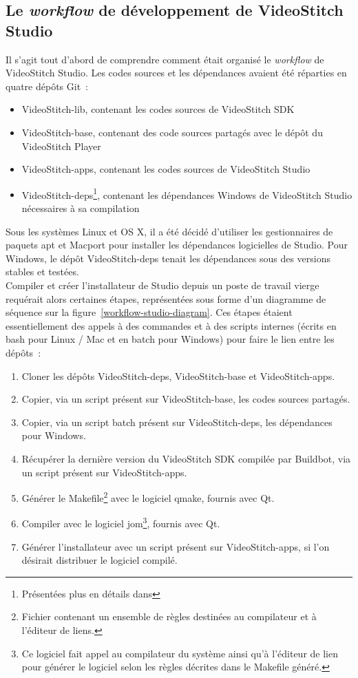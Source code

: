 \subsection{Le \textit{workflow} de développement de VideoStitch Studio}
\label{workflow-studio}
Il s'agit tout d'abord de comprendre comment était organisé le \textit{workflow} 
de VideoStitch Studio.
Les codes sources et les dépendances avaient été réparties en quatre dépôts Git~: 
\begin{itemize}
  \item VideoStitch-lib, contenant les codes sources de VideoStitch SDK
  \item VideoStitch-base, contenant des code sources partagés avec le dépôt du VideoStitch Player
  \item VideoStitch-apps, contenant les codes sources de VideoStitch Studio
  \item VideoStitch-deps\footnote{Présentées plus en détails dans }, 
  contenant les dépendances Windows de VideoStitch Studio 
  nécessaires à sa compilation
\end{itemize}
Sous les systèmes Linux et OS X, il a été décidé d'utiliser les gestionnaires
de paquets apt et Macport pour installer les dépendances logicielles de Studio. Pour
Windows, le dépôt VideoStitch-deps tenait les dépendances sous des versions stables et testées.\\
\newline
Compiler et créer l'installateur de Studio depuis un poste de travail vierge requérait alors
certaines étapes, représentées sous forme d'un diagramme de séquence sur la figure~\ref{workflow-studio-diagram}.
Ces étapes étaient essentiellement des appels à des commandes et à des scripts internes
(écrits en bash pour Linux / Mac et en batch pour Windows) pour faire le lien entre les dépôts~:
\begin{enumerate}
  \item Cloner les dépôts VideoStitch-deps, VideoStitch-base et VideoStitch-apps.
  \item Copier, via un script présent sur VideoStitch-base, les codes sources partagés.
  \item Copier, via un script batch présent sur VideoStitch-deps, les dépendances pour Windows.
  \item Récupérer la dernière version du VideoStitch SDK compilée par Buildbot, 
  via un script présent sur VideoStitch-apps.
  \item Générer le Makefile\footnote{Fichier contenant un ensemble de règles destinées
  au compilateur et à l'éditeur de liens.} avec le logiciel qmake, fournis avec Qt.
  \item Compiler avec le logiciel jom\footnote{Ce logiciel fait appel au compilateur 
  du système ainsi qu'à l'éditeur de lien pour générer le logiciel selon les règles
  décrites dans le Makefile généré.}, fournis avec Qt.
  \item Générer l'installateur avec un script présent sur VideoStitch-apps, si
  l'on désirait distribuer le logiciel compilé.
\end{enumerate}
